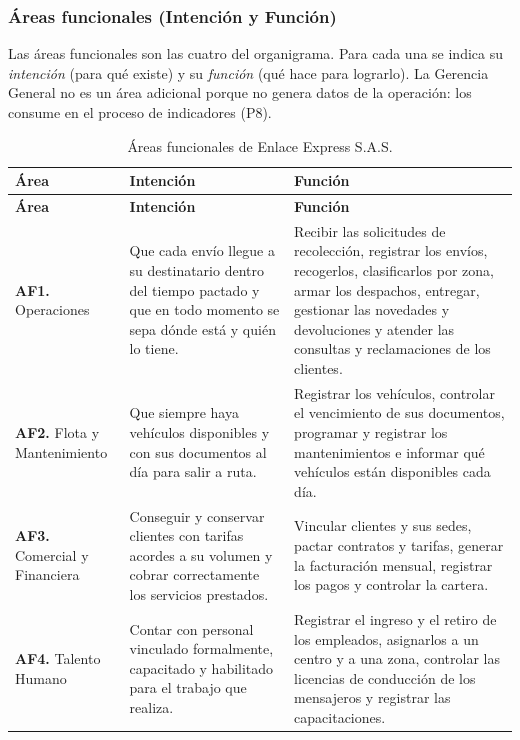 \subsubsection{Áreas funcionales (Intención y Función)}

Las áreas funcionales son las cuatro del organigrama. Para cada una se
indica su \textit{intención} (para qué existe) y su \textit{función}
(qué hace para lograrlo). La Gerencia General no es un área adicional
porque no genera datos de la operación: los consume en el proceso de
indicadores (P8).

{\singlespacing
\begin{longtable}{L{2.6cm} L{5.4cm} L{6.4cm}}
\caption{Áreas funcionales de Enlace Express S.A.S.}
\label{tab:areas}\\
\toprule
\textbf{Área} & \textbf{Intención} & \textbf{Función} \\
\midrule
\endfirsthead
\toprule
\textbf{Área} & \textbf{Intención} & \textbf{Función} \\
\midrule
\endhead
\bottomrule
\endfoot
\textbf{AF1.} Operaciones &
Que cada envío llegue a su destinatario dentro del tiempo pactado y que
en todo momento se sepa dónde está y quién lo tiene. &
Recibir las solicitudes de recolección, registrar los envíos,
recogerlos, clasificarlos por zona, armar los despachos, entregar,
gestionar las novedades y devoluciones y atender las consultas y
reclamaciones de los clientes. \\
\midrule
\textbf{AF2.} Flota y Mantenimiento &
Que siempre haya vehículos disponibles y con sus documentos al día
para salir a ruta. &
Registrar los vehículos, controlar el vencimiento de sus documentos,
programar y registrar los mantenimientos e informar qué vehículos están
disponibles cada día. \\
\midrule
\textbf{AF3.} Comercial y Financiera &
Conseguir y conservar clientes con tarifas acordes a su volumen y
cobrar correctamente los servicios prestados. &
Vincular clientes y sus sedes, pactar contratos y tarifas, generar la
facturación mensual, registrar los pagos y controlar la cartera. \\
\midrule
\textbf{AF4.} Talento Humano &
Contar con personal vinculado formalmente, capacitado y habilitado para
el trabajo que realiza. &
Registrar el ingreso y el retiro de los empleados, asignarlos a un
centro y a una zona, controlar las licencias de conducción de los
mensajeros y registrar las capacitaciones. \\
\end{longtable}
\par}

